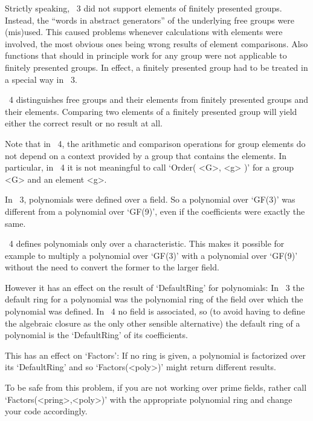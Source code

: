 Strictly speaking, {\GAP}~3 did not support elements of finitely
presented groups.  Instead, the ``words in abstract generators'' of
the underlying free groups were (mis)used.  This caused problems
whenever calculations with elements were involved, the most obvious
ones being wrong results of element comparisons.  Also functions
that should in principle work for any group were not applicable to
finitely presented groups.  In effect, a finitely presented group had
to be treated in a special way in {\GAP}~3.

{\GAP}~4 distinguishes free groups and their elements from finitely
presented groups and their elements.  Comparing two elements of a
finitely presented group will yield either the correct result or no
result at all.

Note that in {\GAP}~4, the arithmetic and comparison operations for
group elements do not depend on a context provided by a group that
contains the elements.  In particular, in {\GAP}~4 it is not
meaningful to call `Order( <G>, <g> )' for a group <G> and an element
<g>.


In {\GAP}~3, polynomials were defined over a field. So a polynomial over
`GF(3)' was different from a polynomial over `GF(9)', even if the
coefficients were exactly the same.

{\GAP}~4 defines polynomials only over a characteristic. This makes it
possible for example to multiply a polynomial over `GF(3)' with a polynomial
over `GF(9)' without the need to convert the former to the larger field.

However it has an effect on the result of `DefaultRing' for polynomials:
In {\GAP}~3 the default ring for a polynomial was the polynomial ring of the
field over which the polynomial was defined. In {\GAP}~4 no field is
associated, so (to avoid having to define the algebraic closure as the only
other sensible alternative) the default ring of a polynomial is the
`DefaultRing' of its coefficients.

This has an effect on `Factors': If no ring is given, a polynomial is
factorized over its `DefaultRing' and so `Factors(<poly>)'
might return different results.

To be safe from this problem, if you are not working over prime fields,
rather call `Factors(<pring>,<poly>)' with the appropriate polynomial ring
and change your code accordingly.

